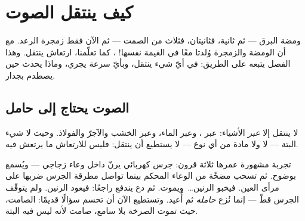 \chapter{كيف ينتقل الصوت}\label{ch:g4:how-sound-travels}

ومضة البرق --- ثم ثانية، فثانيتان، فثلاث من الصمت --- ثم الآن
فقط زمجرة الرعد. مع أن الومضة والزمجرة وُلدتا معًا في الغيمة
نفسها! ، كما تعلّمنا، ارتعاش ينتقل. وهذا الفصل يتبعه على
الطريق: في أيّ شيء ينتقل، وبأيّ سرعة يجري، وماذا يحدث حين يصطدم
بجدار.

\section{الصوت يحتاج إلى حامل}

\begin{proposition}\label{prop:g4:how-sound-travels:carrier}
لا ينتقل  إلا \emph{عبر} الأشياء: عبر ، وعبر الماء،
وعبر الخشب والآجرّ والفولاذ. وحيث لا شيء البتة --- لا  ولا
مادة من أي نوع --- لا يستطيع  أن ينتقل: فليس للارتعاش ما
يرتعش فيه.
\end{proposition}

\begin{example}\label{ex:g4:how-sound-travels:jar}
تجربة مشهورة عمرها ثلاثة قرون: جرس كهربائي يرنّ داخل وعاء زجاجي
--- ويُسمع بوضوح. ثم تسحب مضخّة  من الوعاء المحكم بينما
تواصل مطرقة الجرس ضربها على مرأى العين. فيخبو الرنين\dots\
ويموت. ثم دع  يندفع راجعًا: فيعود الرنين. ولم يتوقّف
الجرس قطّ --- إنما نُزع \emph{حامله} ثم أُعيد. وتستطيع الآن أن
تحسم سؤالًا قديمًا:  الصامت، حيث تموت الصرخة بلا سامع،
صامت لأنه ليس فيه \omterm{def:g2:air-around-us:air}{هواء} البتة.
\end{example}

